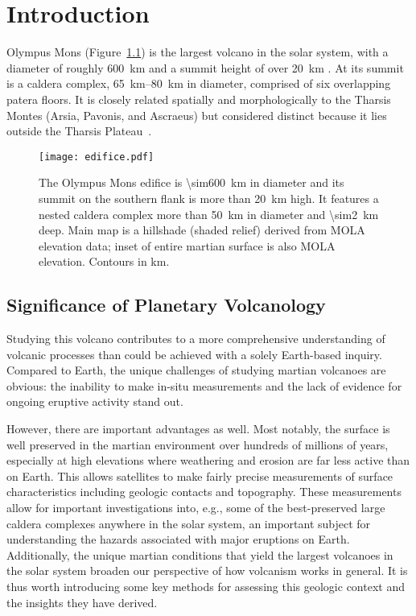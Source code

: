 \chapter{Introduction}

Olympus Mons (Figure~\ref{fig:edifice}) is the largest volcano in the solar system, with a diameter of roughly \qty{600}{\km} and a summit height of over \qty{20}{\km} \parencite[e.g.,][]{plescia_morphometric_2004}. At its summit is a caldera complex, \qtyrange{65}{80}{\km} in diameter, comprised of six overlapping patera floors. It is closely related spatially and morphologically to the Tharsis Montes (Arsia, Pavonis, and Ascraeus) but considered distinct because it lies outside the Tharsis Plateau~\parencite[e.g.,][]{carr_volcanism_1973}.

\begin{figure}
    \centering
    \texttt{[image: edifice.pdf]}
    \caption[Olympus Mons]{The Olympus Mons edifice is \qty{\sim600}{\km} in diameter and its summit on the southern flank is more than \qty{20}{\km} high. It features a nested caldera complex more than \qty{50}{\km} in diameter and \qty{\sim2}{\km} deep. Main map is a hillshade (shaded relief) derived from \acf{MOLA} elevation data\parencite{smith_mars_2001}; inset of entire martian surface is also \acs{MOLA} elevation. Contours in \unit{\km}.}\label{fig:edifice}
\end{figure}

\section{Significance of Planetary Volcanology}

Studying this volcano contributes to a more comprehensive understanding of volcanic processes than could be achieved with a solely Earth-based inquiry. Compared to Earth, the unique challenges of studying martian volcanoes are obvious: the inability to make in-situ measurements and the lack of evidence for ongoing eruptive activity stand out. 

However, there are important advantages as well. Most notably, the surface is well preserved in the martian environment over hundreds of millions of years, especially at high elevations where weathering and erosion are far less active than on Earth. This allows satellites to make fairly precise measurements of surface characteristics including geologic contacts and topography. These measurements allow for important investigations into, e.g., some of the best-preserved large caldera complexes anywhere in the solar system, an important subject for understanding the hazards associated with major eruptions on Earth. Additionally, the unique martian conditions that yield the largest volcanoes in the solar system broaden our perspective of how volcanism works in general. It is thus worth introducing some key methods for assessing this geologic context and the insights they have derived.

